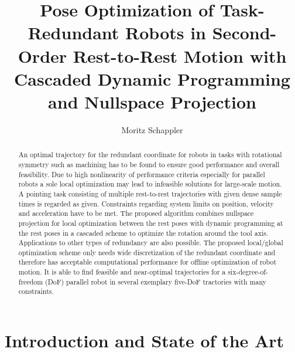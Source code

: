 \documentclass[runningheads]{llncs}
\begin{document}
%
\title{Pose Optimization of Task-Redundant Robots in Second-Order Rest-to-Rest Motion with Cascaded Dynamic Programming and Nullspace Projection}
%
\author{Moritz Schappler}
%
%
%
\maketitle %
%
\begin{abstract}
An optimal trajectory for the redundant coordinate for robots in tasks with rotational symmetry such as machining has to be found to ensure good performance and overall feasibility.
Due to high nonlinearity of performance criteria especially for parallel robots a sole local optimization may lead to infeasible solutions for large-scale motion.
A pointing task consisting of multiple rest-to-rest trajectories with given dense sample times is regarded as given.
Constraints regarding system limits on position, velocity and acceleration have to be met.
The proposed algorithm combines nullspace projection for local optimization between the rest poses with dynamic programming at the rest poses in a cascaded scheme to optimize the rotation around the tool axis.
Applications to other types of redundancy are also possible.
The proposed local/global optimization scheme only needs wide discretization of the redundant coordinate and therefore has acceptable computational performance for offline optimization of robot motion.
It is able to find feasible and near-optimal trajectories for a six-degree-of-freedom (DoF) parallel robot in several exemplary five-DoF tractories with many constraints.


\end{abstract}
%
%
%
\section{Introduction and State of the Art}
\end{document}

